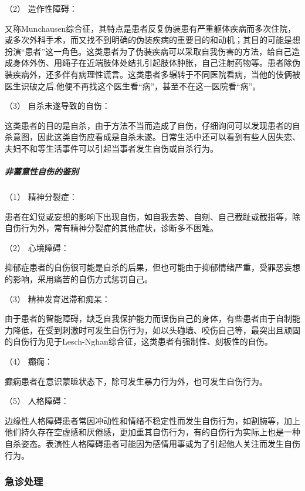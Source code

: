 \hypertarget{text00053.htmlux5cux23CHP1-18-11-2-1-2}{}
（2） 造作性障碍：

又称Munchausen综合征，其特点是患者反复伪装患有严重躯体疾病而多次住院，或多次外科手术，而又找不到明确的伪装疾病的重要目的和动机；其目的可能是想扮演“患者”这一角色。这类患者为了伪装疾病可以采取自我伤害的方法，给自己造成身体外伤、用绳子在近端肢体处结扎引起肢体肿胀，自己注射药物等。患者除伪装疾病外，还多伴有病理性谎言。这类患者多辗转于不同医院看病，当他的伎俩被医生识破之后.他便不再找这个医生看“病”，甚至不在这一医院看“病”。

\hypertarget{text00053.htmlux5cux23CHP1-18-11-2-1-3}{}
（3） 自杀未遂导致的自伤：

这类患者的目的是自杀，由于方法不当而造成了自伤，仔细询问可以发现患者的自杀意图，因此这类自伤应看成是自杀未遂。日常生活中还可以看到有些人因失恋、夫妇不和等生活事件可以引起当事者发生自伤或自杀行为。

\subparagraph{非蓄意性自伤的鉴别}

\hypertarget{text00053.htmlux5cux23CHP1-18-11-2-2-1}{}
（1） 精神分裂症：

患者在幻觉或妄想的影响下出现自伤，如自我去势、自剜、自己截趾或截指等，除自伤行为外，常有精神分裂症的其他症状，诊断多不困难。

\hypertarget{text00053.htmlux5cux23CHP1-18-11-2-2-2}{}
（2） 心境障碍：

抑郁症患者的自伤很可能是自杀的后果，但也可能由于抑郁情绪严重，受罪恶妄想的影响，采用痛苦的自伤方式惩罚自己。

\hypertarget{text00053.htmlux5cux23CHP1-18-11-2-2-3}{}
（3） 精神发育迟滞和痴呆：

由于患者的智能障碍，缺乏自我保护能力而误伤自己的身体，有些患者由于自制能力降低，在受到刺激时可发生自伤行为，如以头碰墙、咬伤自己等，最突出且顽固的自伤行为见于Lesch-Nghan综合征，这类患者有强制性、刻板性的自伤。

\hypertarget{text00053.htmlux5cux23CHP1-18-11-2-2-4}{}
（4） 癫痫：

癫痫患者在意识蒙眬状态下，除可发生暴力行为外，也可发生自伤行为。

\hypertarget{text00053.htmlux5cux23CHP1-18-11-2-2-5}{}
（5） 人格障碍：

边缘性人格障碍患者常因冲动性和情绪不稳定性而发生自伤行为，如割腕等，加上他们持久存在空虚感和厌倦感，更加重其自伤行为，有的自伤行为实际上也是一种自杀姿态。表演性人格障碍患者可能因为感情用事或为了引起他人关注而发生自伤行为。

\subsubsection{急诊处理}


